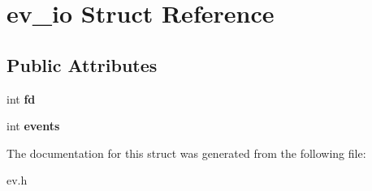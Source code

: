 \hypertarget{structev__io}{}\section{ev\+\_\+io Struct Reference}
\label{structev__io}
\subsection*{Public Attributes}
\begin{DoxyCompactItemize}
\item 
\hypertarget{structev__io_a5c7e481bb08731a54a00c341d3fccb69}{}\label{structev__io_a5c7e481bb08731a54a00c341d3fccb69} 
int {\bfseries fd}
\item 
\hypertarget{structev__io_a439e3de48a504c0a64cc710338ce1349}{}\label{structev__io_a439e3de48a504c0a64cc710338ce1349} 
int {\bfseries events}
\end{DoxyCompactItemize}


The documentation for this struct was generated from the following file\+:\begin{DoxyCompactItemize}
\item 
ev.\+h\end{DoxyCompactItemize}
